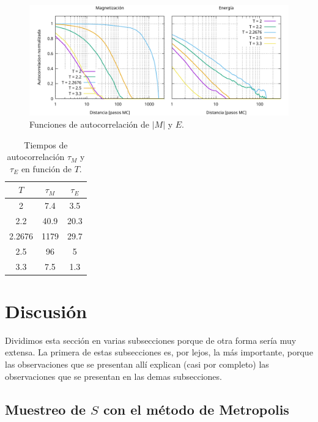 \documentclass[a4paper,12pt]{article}
\begin{document}
\begin{figure}[h!]
    \centering
    \includegraphics[width = \textwidth]{../img/e.pdf}
    \caption{Funciones de autocorrelación de $|M|$ y $E$.}
    \label{fig:e}
\end{figure}

\newpage

\begin{table}[h!]
    \centering
    \begin{tabular}{c|c|c}
        $T$ & $\tau_M$ & $\tau_E$ \\ \hline
        2 & 7.4 & 3.5 \\
        2.2 & 40.9 & 20.3 \\
        2.2676 & 1179 & 29.7 \\
        2.5 & 96 & 5  \\
        3.3 & 7.5 & 1.3  \\
    \end{tabular}
    \caption{Tiempos de autocorrelación \( \tau_M \) y \( \tau_E \) en función de $T$.}
    \label{tab:tau}
\end{table}

\section{Discusión}

Dividimos esta sección en varias subsecciones porque de otra forma sería muy extensa. La primera de estas subsecciones es, por lejos, la más importante, porque las observaciones que se presentan allí explican (casi por completo) las observaciones que se presentan en las demas subsecciones.

\subsection{Muestreo de $S$ con el método de Metropolis}
\end{document}
